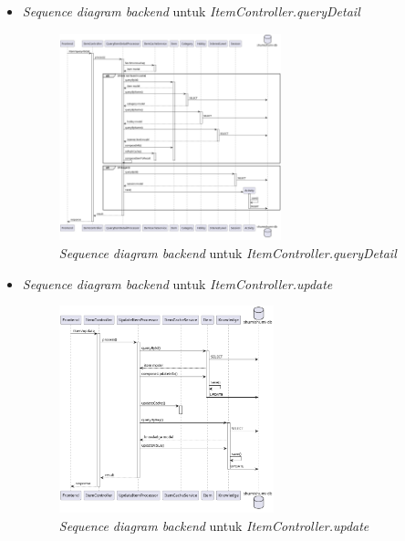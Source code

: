 \documentclass[a4paper]{article}
\begin{document}
\begin{enumerate}
\begin{enumerate}
\begin{itemize}
            \newpage
            \item \textit{Sequence diagram backend} untuk \textit{ItemController.queryDetail}
            \begin{figure}[h]
                \centering
                \includegraphics*[height=6cm]{diagram/sequence diagram/BE/item controller/queryDetail/queryDetail.png}
                \caption{\textit{Sequence diagram backend} untuk \textit{ItemController.queryDetail}}
            \end{figure}

            \item \textit{Sequence diagram backend} untuk \textit{ItemController.update}
            \begin{figure}[h]
                \centering
                \includegraphics*[height=6cm]{diagram/sequence diagram/BE/item controller/update/update.png}
                \caption{\textit{Sequence diagram backend} untuk \textit{ItemController.update}}
            \end{figure}


\end{itemize}
\end{enumerate}
\end{enumerate}
\end{document}
